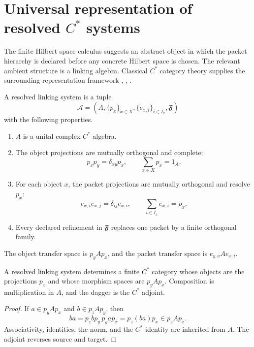 \documentclass{aomart}
\theoremstyle{definition}
\theoremstyle{remark}
\newcommand{\Acal}{\mathcal A}
\newcommand{\Rcite}[1]{\cite{#1}}
\begin{document}
\section{Universal representation of resolved \texorpdfstring{\(C^*\)}{C star} systems}\label{sec:universal}

The finite Hilbert space calculus suggests an abstract object in which the packet hierarchy is declared before any concrete Hilbert space is chosen. The relevant ambient structure is a linking algebra. Classical \(C^*\) category theory supplies the surrounding representation framework \Rcite{R2}, \Rcite{R3}, \Rcite{R4}.

\begin{definition}\label{def:resolved_linking_system}
A resolved linking system is a tuple
\[
 \Acal
 =
 \left(
 A,
 \{p_x\}_{x\in X},
 \{e_{x,i}\}_{i\in I_x},
 \mathfrak F
 \right)
\]
with the following properties.
\begin{enumerate}[label=\textup{(L\arabic*)}]
\item \(A\) is a unital complex \(C^*\) algebra.
\item The object projections are mutually orthogonal and complete:
\[
 p_xp_y=\delta_{xy}p_x,
 \qquad
 \sum_{x\in X}p_x=1_A.
\]
\item For each object \(x\), the packet projections are mutually orthogonal and resolve \(p_x\):
\[
 e_{x,i}e_{x,j}=\delta_{ij}e_{x,i},
 \qquad
 \sum_{i\in I_x}e_{x,i}=p_x.
\]
\item Every declared refinement in \(\mathfrak F\) replaces one packet by a finite orthogonal family.
\end{enumerate}
The object transfer space is \(p_yAp_x\), and the packet transfer space is \(e_{y,a}Ae_{x,i}\).
\end{definition}

\begin{proposition}\label{prop:corner_category}
A resolved linking system determines a finite \(C^*\) category whose objects are the projections \(p_x\) and whose morphism spaces are \(p_yAp_x\). Composition is multiplication in \(A\), and the dagger is the \(C^*\) adjoint.
\end{proposition}

\begin{proof}
If \(a\in p_yAp_x\) and \(b\in p_zAp_y\), then
\[
 ba=p_zbp_y\,p_yap_x=p_z(ba)p_x\in p_zAp_x.
\]
Associativity, identities, the norm, and the \(C^*\) identity are inherited from \(A\). The adjoint reverses source and target.
\end{proof}
\end{document}
